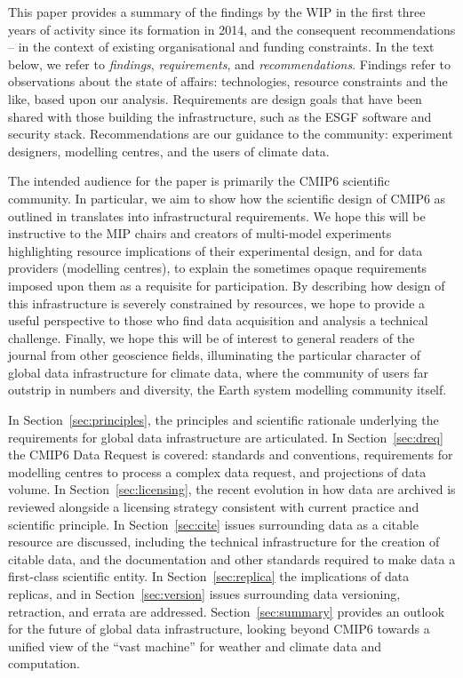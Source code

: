 \documentclass[gmd,manuscript]{copernicus}
\begin{document}
This paper provides a summary of the findings by the WIP in the first
three years of activity since its formation in 2014, and the
consequent recommendations -- in the context of existing
organisational and funding constraints.
In the text below, we refer to \emph{findings}, \emph{requirements},
and \emph{recommendations}. Findings refer to observations about the
state of affairs: technologies, resource constraints and the like,
based upon our analysis. Requirements are design goals that have been
shared with those building the infrastructure, such as the ESGF
software and security stack. Recommendations are our guidance to the community:
experiment designers, modelling centres, and the users of climate data.

The intended audience for the paper is primarily the CMIP6 scientific
community. In particular, we aim to show how the
scientific design of CMIP6 as outlined in \cite{ref:eyringetal2016a}
translates into infrastructural requirements. We hope this will be
instructive to the MIP chairs and creators of multi-model experiments 
highlighting resource implications of their experimental design, and for data providers
(modelling centres), to explain the sometimes opaque requirements imposed
upon them as a requisite for participation. By describing how 
design of this infrastructure is severely constrained by resources, we hope to
provide a useful perspective to  those who find data acquisition and analysis a technical
challenge.   Finally, we hope this will be of
interest to general readers of the journal from other geoscience
fields, illuminating the particular character of global data
infrastructure for climate data, where the community of users far
outstrip in numbers and diversity, the Earth system modelling community
itself.

In Section~\ref{sec:principles}, the principles and scientific
rationale underlying the requirements for global data infrastructure
are articulated. In Section~\ref{sec:dreq} the CMIP6 Data Request is
covered: standards and conventions, requirements for modelling centres
to process a complex data request, and projections of data volume. In
Section~\ref{sec:licensing}, the recent evolution in how data are archived
is reviewed alongside a licensing strategy consistent with current
practice and scientific principle. In Section~\ref{sec:cite} issues
surrounding data as a citable resource are discussed, including the
technical infrastructure for the creation of citable data, and the
documentation and other standards required to make data a first-class
scientific entity. In Section~\ref{sec:replica} the implications of
data replicas, and in Section~\ref{sec:version} issues surrounding data
versioning, retraction, and errata are addressed.
Section~\ref{sec:summary} provides an outlook for the future of global
data infrastructure, looking beyond CMIP6 towards a unified view of
the ``vast machine'' for weather and climate data and computation.
\end{document}
